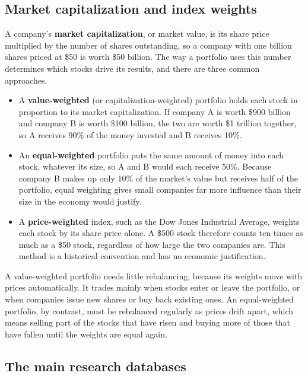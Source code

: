 \subsection{Market capitalization and index weights}

A company's \textbf{market capitalization}, or market value, is its share price multiplied by the number of shares outstanding, so a company with one billion shares priced at \$50 is worth \$50 billion. The way a portfolio uses this number determines which stocks drive its results, and there are three common approaches.

\begin{itemize}
  \item A \textbf{value-weighted} (or capitalization-weighted) portfolio holds each stock in proportion to its market capitalization. If company A is worth \$900 billion and company B is worth \$100 billion, the two are worth \$1 trillion together, so A receives 90\% of the money invested and B receives 10\%.
  \item An \textbf{equal-weighted} portfolio puts the same amount of money into each stock, whatever its size, so A and B would each receive 50\%. Because company B makes up only 10\% of the market's value but receives half of the portfolio, equal weighting gives small companies far more influence than their size in the economy would justify.
  \item A \textbf{price-weighted} index, such as the Dow Jones Industrial Average, weights each stock by its share price alone. A \$500 stock therefore counts ten times as much as a \$50 stock, regardless of how large the two companies are. This method is a historical convention and has no economic justification.
\end{itemize}

A value-weighted portfolio needs little rebalancing, because its weights move with prices automatically. It trades mainly when stocks enter or leave the portfolio, or when companies issue new shares or buy back existing ones. An equal-weighted portfolio, by contrast, must be rebalanced regularly as prices drift apart, which means selling part of the stocks that have risen and buying more of those that have fallen until the weights are equal again.


\subsection{The main research databases}

